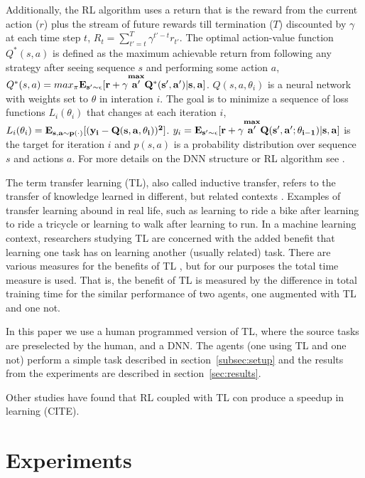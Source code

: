 \documentclass{llncs}
\begin{document}
Additionally, the RL algorithm uses a return that is the reward from the current action ($r$) plus the stream of future rewards till termination ($T$) discounted by $\gamma$ at each time step $t$, $R_{t}=\sum_{t' = t}^{T}\gamma^{t'-t}r_{t'}$.
The optimal action-value function $Q^{*}(s,a)$ is defined as the maximum achievable return from following any strategy after seeing sequence $s$ and performing some action $a$, $Q^{*}(s,a)=max_{\pi}\bf{E}_{s' \sim \epsilon} [r + \gamma \overset{max}{a'} Q^{*}(s',a') | s,a]$.
$Q(s,a,\theta_{i})$ is a neural network with weights set to $\theta$ in interation $i$.
The goal is to minimize a sequence of loss functions $L_{i}(\theta_{i})$ that changes at each iteration $i$, $L_{i}(\theta_{i}) = \bf{E}_{s,a \sim p(\cdot)}[(y_{i}-Q(s,a,\theta_{i}))^{2}]$.
$y_{i}=\bf{E}_{s' \sim \epsilon} [r + \gamma \overset{max}{a'} Q(s',a';\theta_{i-1})|s,a]$ is the target for iteration $i$ and $p(s,a)$ is a probability distribution over sequence $s$ and actions $a$. 
For more details on the DNN structure or RL algorithm see \citep{mnih2015human}.

The term transfer learning (TL), also called inductive transfer, refers to the transfer of knowledge learned in different, but related contexts \citep{ramon2007transfer}.
Examples of transfer learning abound in real life, such as learning to ride a bike after learning to ride a tricycle or learning to walk after learning to run. 
In a machine learning context, researchers studying TL are concerned with the added benefit that learning one task has on learning another (usually related) task.
There are various measures for the benefits of TL \citep{taylor2009transfer}, but for our purposes the total time measure is used.
That is, the benefit of TL is measured by the difference in total training time for the similar performance of two agents, one augmented with TL and one not. 

In this paper we use a human programmed version of TL, where the source tasks are preselected by the human, and a DNN.
The agents (one using TL and one not) perform a simple task described in section~\ref{subsec:setup} and the results from the experiments are described in section~\ref{sec:results}.

Other studies have found that RL coupled with TL con produce a speedup in learning (CITE).

\section{Experiments}\label{sec:experiments}
\end{document}
